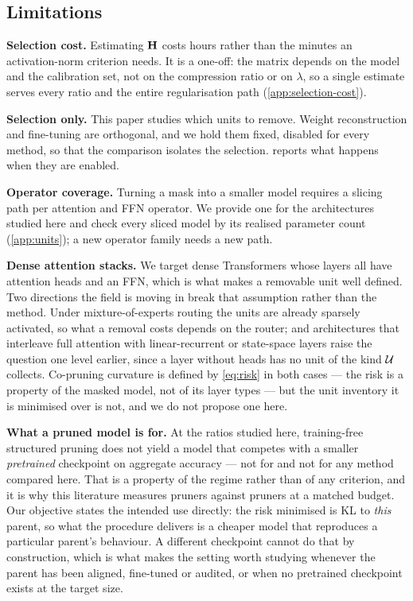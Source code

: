 \subsection{Limitations}
\label{app:limitations}
\textbf{Selection cost.} Estimating $\mathbf{H}$ costs hours rather than the minutes an activation-norm
criterion needs. It is a one-off: the matrix depends on the model and the calibration set, not on
the compression ratio or on $\lambda$, so a single estimate serves every ratio and the entire
regularisation path (\cref{app:selection-cost}).

\textbf{Selection only.} This paper studies which units to remove. Weight reconstruction and
fine-tuning are orthogonal, and we hold them fixed, disabled for every method, so that the
comparison isolates the selection.  reports what happens when they are enabled.

\textbf{Operator coverage.} Turning a mask into a smaller model requires a slicing path per
attention and FFN operator. We provide one for the architectures studied here and check every sliced
model by its realised parameter count (\cref{app:units}); a new operator family needs a new path.

\textbf{Dense attention stacks.} We target dense Transformers whose layers all have attention heads and
an FFN, which is what makes a removable unit well defined. Two directions the field is moving in break
that assumption rather than the method. Under mixture-of-experts routing the units are already sparsely
activated, so what a removal costs depends on the router; and architectures that interleave full
attention with linear-recurrent or state-space layers raise the question one level earlier, since a
layer without heads has no unit of the kind $\mathcal{U}$ collects. Co-pruning curvature is defined by
\cref{eq:risk} in both cases --- the risk is a property of the masked model, not of its layer types ---
but the unit inventory it is minimised over is not, and we do not propose one here.

\textbf{What a pruned model is for.} At the ratios studied here, training-free structured pruning does
not yield a model that competes with a smaller \emph{pretrained} checkpoint on aggregate accuracy ---
not for \method and not for any method compared here. That is a property of the regime rather than of
any criterion, and it is why this literature measures pruners against pruners at a matched budget. Our
objective states the intended use directly: the risk minimised is KL to \emph{this} parent, so what the
procedure delivers is a cheaper model that reproduces a particular parent's behaviour. A different
checkpoint cannot do that by construction, which is what makes the setting worth studying whenever the
parent has been aligned, fine-tuned or audited, or when no pretrained checkpoint exists at the target
size.

